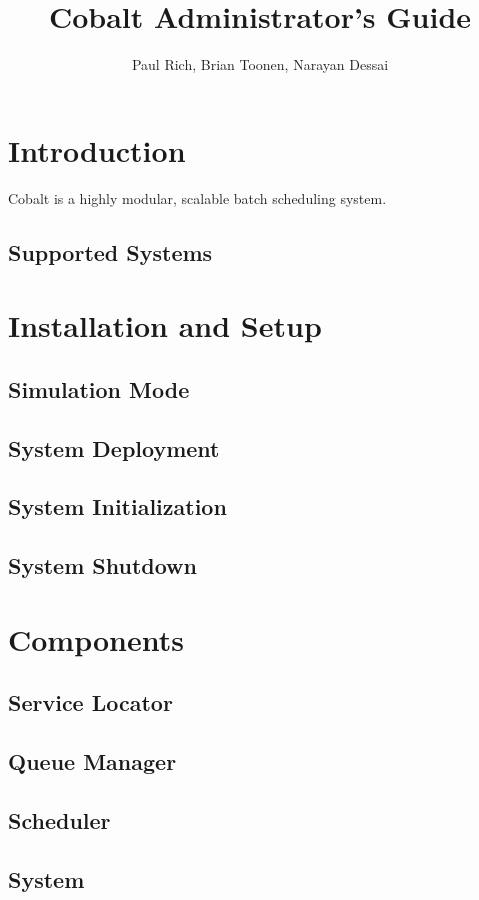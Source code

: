 \documentclass[10pt,letterpaper]{book}
\begin{document}
\title {\textbf{Cobalt Administrator's Guide}}
\author{Paul Rich, Brian Toonen, Narayan Dessai}

\maketitle
\tableofcontents
\chapter{Introduction}
Cobalt is a highly modular, scalable batch scheduling system.  
\section{Supported Systems}

\chapter{Installation and Setup}
\section{Simulation Mode}
\section{System Deployment}
\section{System Initialization}
\section{System Shutdown}

\chapter{Components}
\section{Service Locator}
\section{Queue Manager}
\section{Scheduler}
\section{System}
\end{document}
